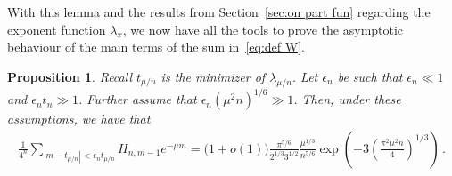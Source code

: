 \documentclass{article}
\newcommand{\1}{\mathbbm{1}}								%
\newtheorem{proposition}[theorem]{Proposition}
\theoremstyle{definition}
\numberwithin{equation}{section}
\begin{document}
With this lemma and the results from Section~\ref{sec:on part fun} regarding the exponent function $\lambda_x$, we now have all the tools to prove the asymptotic behaviour of the main terms of the sum in~\eqref{eq:def W}.

\begin{proposition}\label{prop:W main}
    {Recall} $t_{\mu/n}$ is the minimizer of $\lambda_{\mu/n}$.
    Let $\epsilon_n$ be such that $\epsilon_n\ll1$ and $\epsilon_nt_n\gg1$.
    Further assume that $\epsilon_n(\mu^2n)^{1/6}\gg1$.
    Then, under these assumptions, we have that
    \begin{align*}
        \frac{1}{4^n}\sum_{|m-t_{\mu/n}|<\epsilon_nt_{\mu/n}}H_{n,m-1}e^{-\mu m}=\big(1+o(1)\big)\frac{\pi^{5/6}}{2^{1/3}3^{1/2}}\frac{\mu^{1/3}}{n^{5/6}}\exp\left(-3\left(\frac{\pi^2\mu^2n}{4}\right)^{1/3}\right)\,.
    \end{align*}
\end{proposition}
\end{document}
